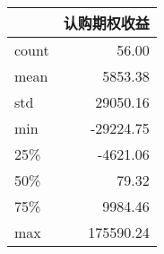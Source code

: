 \begin{tabular}{lr}
\toprule
{} &    认购期权收益 \\
\midrule
count &     56.00 \\
mean  &   5853.38 \\
std   &  29050.16 \\
min   & -29224.75 \\
25\%   &  -4621.06 \\
50\%   &     79.32 \\
75\%   &   9984.46 \\
max   & 175590.24 \\
\bottomrule
\end{tabular}
